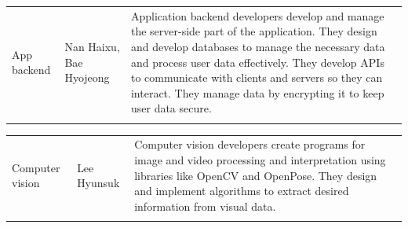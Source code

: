 \documentclass[11pt, conference]{IEEEtran}
\begin{document}
\begin{enumerate}[label=\arabic*.]
\begin{enumerate}[label=\arabic*]
    \begin{table}[H]
    \center
    \begin{tabular}{m{1.4cm} m{1.5cm} m{4cm}}
    App backend & Nan Haixu, Bae Hyojeong & Application backend developers develop and manage the server-side part of the application. They design and develop databases to manage the necessary data and process user data effectively. They develop APIs to communicate with clients and servers so they can interact. They manage data by encrypting it to keep user data secure. \\\\
    \bottomrule
    \end{tabular}
    \end{table}

    \begin{table}[H]
    \center
    \begin{tabular}{m{1.4cm} m{1.5cm} m{4cm}}
    Computer vision & Lee Hyunsuk & Computer vision developers create programs for image and video processing and interpretation using libraries like OpenCV and OpenPose. They design and implement algorithms to extract desired information from visual data. \\\\
    \bottomrule
    \end{tabular}
    \end{table}
    
\end{enumerate}


\end{enumerate}
\end{document}
